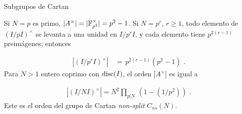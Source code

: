 \begin{subsection}{Subgrupos de Cartan}
\begin{ejemploSubgrupoDeCartan}
Si $N=p$ es  primo, $|A^{\times}|=|\bb{F}_{p^{2}}^{\times}|=p^{2}-1$.
Si $N=p^{r}$, $r\geq 1$, todo elemento de $(I/pI)^{\times}$ se levanta a una
unidad en $I/p^{r}I$, y cada elemento tiene $p^{2(r-1)}$ preim\'{a}genes;
entonces

\begin{align*}
|(I/p^{r}I)^{\times}| & \,=\, p^{2(r-1)}(p^{2}-1)\text{ .}
\end{align*}
Para $N>1$ entero coprimo con $\rm{disc}(I)$, el orden $|A^{\times}|$ es igual a

\begin{align*}
|(I/NI)^{\times}|=N^{2}\prod_{p|N}\,(1-(1/p^{2}))\text{ .}
\end{align*}
Este es el orden del grupo de Cartan \textit{non-split} $C_{ns}(N)$.
%

\end{ejemploSubgrupoDeCartan}

\end{subsection}

